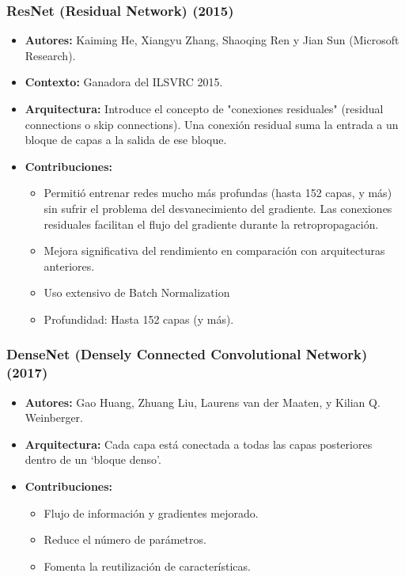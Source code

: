 \documentclass{article}
\begin{document}
\subsubsection{ResNet (Residual Network) (2015)}

\begin{itemize}
    \item \textbf{Autores:}  Kaiming He, Xiangyu Zhang, Shaoqing Ren y Jian Sun (Microsoft Research).
    \item \textbf{Contexto:}  Ganadora del ILSVRC 2015.
    \item \textbf{Arquitectura:}  Introduce el concepto de "conexiones residuales" (residual connections o skip connections).  Una conexión residual suma la entrada a un bloque de capas a la salida de ese bloque.
    \item \textbf{Contribuciones:}
    \begin{itemize}
        \item Permitió entrenar redes mucho más profundas (hasta 152 capas, y más) sin sufrir el problema del desvanecimiento del gradiente. Las conexiones residuales facilitan el flujo del gradiente durante la retropropagación.
        \item Mejora significativa del rendimiento en comparación con arquitecturas anteriores.
        \item Uso extensivo de Batch Normalization
        \item Profundidad: Hasta 152 capas (y más).
    \end{itemize}
\end{itemize}

\subsubsection{DenseNet (Densely Connected Convolutional Network) (2017)}
\begin{itemize}
\item \textbf{Autores:} Gao Huang, Zhuang Liu, Laurens van der Maaten, y Kilian Q. Weinberger.
\item \textbf{Arquitectura:} Cada capa está conectada a todas las capas posteriores dentro de un `bloque denso'.
\item\textbf{Contribuciones:}
    \begin{itemize}
    \item Flujo de información y gradientes mejorado.
    \item Reduce el número de parámetros.
    \item Fomenta la reutilización de características.
    \end{itemize}
\end{itemize}
\end{document}
